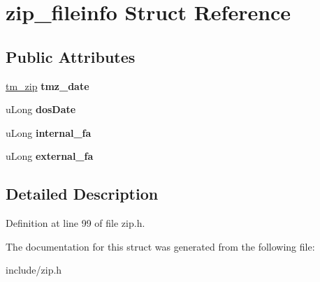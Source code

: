 \hypertarget{structzip__fileinfo}{\section{zip\-\_\-fileinfo Struct Reference}
\label{structzip__fileinfo}
}
\subsection*{Public Attributes}
\begin{DoxyCompactItemize}
\item 
\hypertarget{structzip__fileinfo_ae09a694a598b7507d23705764c9e46fb}{\hyperlink{structtm__zip__s}{tm\-\_\-zip} {\bfseries tmz\-\_\-date}}\label{structzip__fileinfo_ae09a694a598b7507d23705764c9e46fb}

\item 
\hypertarget{structzip__fileinfo_a0541c57e59450fbc17b2f898ca4bc9e8}{u\-Long {\bfseries dos\-Date}}\label{structzip__fileinfo_a0541c57e59450fbc17b2f898ca4bc9e8}

\item 
\hypertarget{structzip__fileinfo_a396175a434b86115ce5600ab1dbb1644}{u\-Long {\bfseries internal\-\_\-fa}}\label{structzip__fileinfo_a396175a434b86115ce5600ab1dbb1644}

\item 
\hypertarget{structzip__fileinfo_ac0be78ded330ffd46815bafc5b6b37bb}{u\-Long {\bfseries external\-\_\-fa}}\label{structzip__fileinfo_ac0be78ded330ffd46815bafc5b6b37bb}

\end{DoxyCompactItemize}


\subsection{Detailed Description}


Definition at line 99 of file zip.\-h.



The documentation for this struct was generated from the following file\-:\begin{DoxyCompactItemize}
\item 
include/zip.\-h\end{DoxyCompactItemize}
